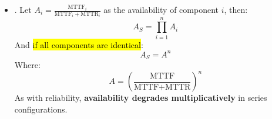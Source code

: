 \begin{itemize}
    \item {}. Let $A_i = \frac{\text{MTTF}_i}{\text{MTTF}_i + \text{MTTR}_i}$ as the availability of component $i$, then:
    \begin{equation}
        A_S = \displaystyle\prod_{i=1}^{n} A_i
    \end{equation}
    And \hl{if all components are identical}:
    \begin{equation}\label{eq: Availability of Series System - Simplified}
        A_S = A^{n}
    \end{equation}
    Where:
    \begin{equation*}
        A = \left(\dfrac{\text{MTTF}}{\text{MTTF} + \text{MTTR}}\right)^{n}
    \end{equation*}
    As with reliability, \textbf{availability degrades multiplicatively} in series configurations.
\end{itemize}

\newpage


